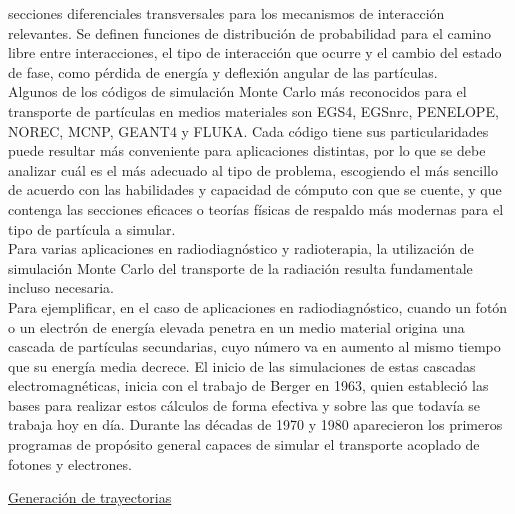 secciones diferenciales transversales para los mecanismos de interacci\'on relevantes.
%
Se definen funciones de distribuci\'on de probabilidad para el camino libre entre interacciones, el tipo de interacci\'on que ocurre y 
el cambio del estado de fase, como p\'erdida de energ\'ia y deflexi\'on angular de las part\'iculas. \\
%
%
Algunos de los c\'odigos de simulaci\'on Monte Carlo m\'as reconocidos para el transporte de part\'iculas en medios
materiales son EGS4, EGSnrc, PENELOPE, NOREC, MCNP, GEANT4 y FLUKA. 
%
Cada c\'odigo tiene sus particularidades puede resultar m\'as conveniente para aplicaciones distintas, por lo que se debe analizar
cu\'al es el m\'as adecuado al tipo de problema, escogiendo el m\'as sencillo de acuerdo con las habilidades y capacidad de c\'omputo 
con que se cuente, y que contenga las secciones eficaces o teor\'ias f\'isicas de respaldo m\'as modernas para el tipo de part\'icula a 
simular. \\
%
%
Para varias aplicaciones en radiodiagn\'ostico y radioterapia, la utilizaci\'on de simulaci\'on Monte Carlo del transporte de la 
radiaci\'on resulta fundamentale incluso necesaria. \\
%
%
Para ejemplificar, en el caso de aplicaciones en radiodiagn\'ostico, cuando un fot\'on o un electr\'on de energ\'ia elevada penetra en un 
medio material origina una cascada de part\'iculas secundarias, cuyo n\'umero va en aumento al mismo tiempo que su energ\'ia media 
decrece. 
%
El inicio de las simulaciones de estas cascadas electromagn\'eticas, inicia con el trabajo de Berger en 1963, quien estableci\'o las
bases para realizar estos c\'alculos de forma efectiva y sobre las que todav\'ia se trabaja hoy en d\'ia. 
%
Durante las d\'ecadas de 1970 y 1980 aparecieron los primeros programas de prop\'osito general capaces de simular el transporte acoplado de 
fotones y electrones. 
%

\begin{center}
\underline{Generaci\'on de trayectorias}
\end{center}

